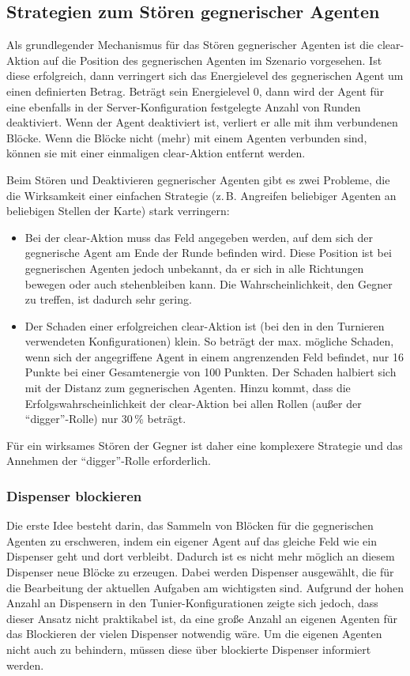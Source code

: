 \documentclass[runningheads]{llncs}
\begin{document}
\subsection{Strategien zum Stören gegnerischer Agenten}
Als grundlegender Mechanismus für das Stören gegnerischer Agenten ist die clear-Aktion auf die Position des gegnerischen Agenten im Szenario vorgesehen. Ist diese erfolgreich, dann verringert sich das Energielevel des gegnerischen Agent um einen definierten Betrag. Beträgt sein Energielevel 0, dann wird der Agent für eine ebenfalls in der Server-Konfiguration festgelegte Anzahl von Runden deaktiviert. Wenn der Agent deaktiviert ist, verliert er alle mit ihm verbundenen Blöcke. Wenn die Blöcke nicht (mehr) mit einem Agenten verbunden sind, können sie mit einer einmaligen clear-Aktion entfernt werden. 

Beim Stören und Deaktivieren gegnerischer Agenten gibt es zwei Probleme, die die Wirksamkeit einer einfachen Strategie (z.\,B. Angreifen beliebiger Agenten an beliebigen Stellen der Karte) stark verringern:
\begin{itemize}
\item{Bei der clear-Aktion muss das Feld angegeben werden, auf dem sich der gegnerische Agent am Ende der Runde befinden wird. Diese Position ist bei gegnerischen Agenten jedoch unbekannt, da er sich in alle Richtungen bewegen oder auch stehenbleiben kann. Die Wahrscheinlichkeit, den Gegner zu treffen, ist dadurch sehr gering.}
\item{Der Schaden einer erfolgreichen clear-Aktion ist (bei den in den Turnieren verwendeten Konfigurationen) klein. So beträgt der max. mögliche Schaden, wenn sich der angegriffene Agent in einem angrenzenden Feld befindet, nur 16 Punkte bei einer Gesamtenergie von 100 Punkten. Der Schaden halbiert sich mit der Distanz zum gegnerischen Agenten. Hinzu kommt, dass die Erfolgswahrscheinlichkeit der clear-Aktion bei allen Rollen (außer der "`digger"'-Rolle) nur 30\,\% beträgt.}
\end{itemize}
Für ein wirksames Stören der Gegner ist daher eine komplexere Strategie und das Annehmen der "`digger"'-Rolle erforderlich.
\subsubsection{Dispenser blockieren}
Die erste Idee besteht darin, das Sammeln von Blöcken für die gegnerischen Agenten zu erschweren, indem ein eigener Agent auf das gleiche Feld wie ein Dispenser geht und dort verbleibt. Dadurch ist es nicht mehr möglich an diesem Dispenser neue Blöcke zu erzeugen. Dabei werden Dispenser ausgewählt, die für die Bearbeitung der aktuellen Aufgaben am wichtigsten sind. Aufgrund der hohen Anzahl an Dispensern in den Tunier-Konfigurationen zeigte sich jedoch, dass dieser Ansatz nicht praktikabel ist, da eine große Anzahl an eigenen Agenten für das Blockieren der vielen Dispenser notwendig wäre. Um die eigenen Agenten nicht auch zu behindern, müssen diese über blockierte Dispenser informiert werden.
\end{document}
